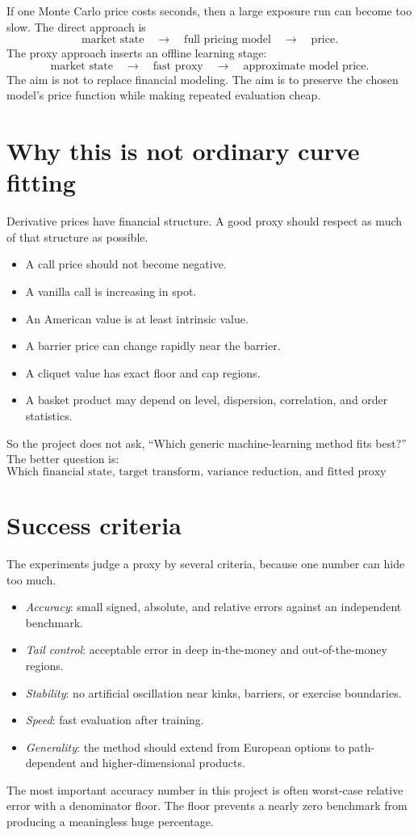 \documentclass[11pt,oneside]{book}
\theoremstyle{definition}
\begin{document}
If one Monte Carlo price costs seconds, then a large exposure run can become too slow. The direct approach is
\[
  \text{market state} \quad \longrightarrow \quad \text{full pricing model} \quad \longrightarrow \quad \text{price}.
\]
The proxy approach inserts an offline learning stage:
\[
  \text{market state} \quad \longrightarrow \quad \text{fast proxy} \quad \longrightarrow \quad \text{approximate model price}.
\]
The aim is not to replace financial modeling. The aim is to preserve the chosen model's price function while making repeated evaluation cheap.

\section{Why this is not ordinary curve fitting}
Derivative prices have financial structure. A good proxy should respect as much of that structure as possible.
\begin{itemize}
  \item A call price should not become negative.
  \item A vanilla call is increasing in spot.
  \item An American value is at least intrinsic value.
  \item A barrier price can change rapidly near the barrier.
  \item A cliquet value has exact floor and cap regions.
  \item A basket product may depend on level, dispersion, correlation, and order statistics.
\end{itemize}
So the project does not ask, ``Which generic machine-learning method fits best?'' The better question is:
\[
  \text{Which financial state, target transform, variance reduction, and fitted proxy work together?}
\]

\section{Success criteria}
The experiments judge a proxy by several criteria, because one number can hide too much.
\begin{itemize}
  \item \emph{Accuracy}: small signed, absolute, and relative errors against an independent benchmark.
  \item \emph{Tail control}: acceptable error in deep in-the-money and out-of-the-money regions.
  \item \emph{Stability}: no artificial oscillation near kinks, barriers, or exercise boundaries.
  \item \emph{Speed}: fast evaluation after training.
  \item \emph{Generality}: the method should extend from European options to path-dependent and higher-dimensional products.
\end{itemize}
The most important accuracy number in this project is often worst-case relative error with a denominator floor. The floor prevents a nearly zero benchmark from producing a meaningless huge percentage.
\end{document}
